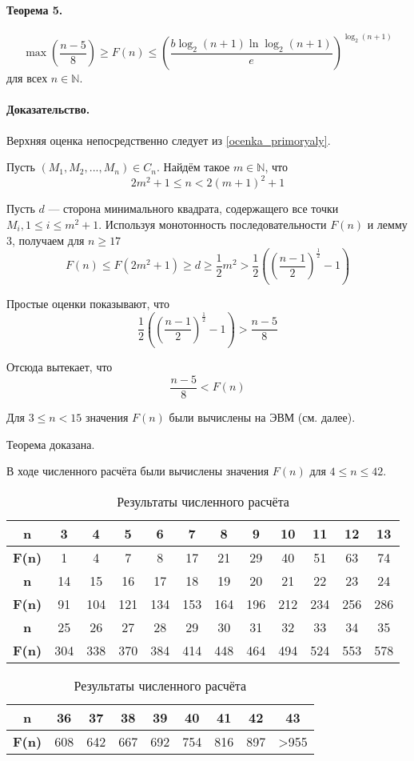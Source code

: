 \documentclass[a4paper,14pt]{article} %
\begin{document}
\paragraph{Теорема 5.}

$$
 \max\left( \frac{n-5}{8} \right) \geq F(n) \leq \left( \frac{b \log_2(n+1) \ln \log_2 (n+1)}{e}\right)^{\log_2(n+1)}
$$
для всех $n\in\mathbb{N}$.

\paragraph{Доказательство.}
Верхняя оценка непосредственно следует из \ref{ocenka_primoryaly}.

Пусть $\left(M_1, M_2, ..., M_n\right) \in C_n$.
Найдём такое $m\in \mathbb{N}$, что
$$
2m^2+1 \leq n < 2(m+1)^2 +1
$$

Пусть $d$ --- сторона минимального квадрата, содержащего все точки $M_i, 1\leq i \leq m^2+1$.
Используя монотонность последовательности $F(n)$ и лемму 3, получаем для $n\geq 17$
$$
F(n) \leq F\left(2m^2+1\right)\geq d \geq \frac{1}{2}m^2 > \frac{1}{2}\left(\left(\frac{n-1}{2}\right)^\frac{1}{2} - 1 \right)
$$

Простые оценки показывают, что
$$
\frac{1}{2}\left(\left(\frac{n-1}{2}\right)^\frac{1}{2} -1 \right) > \frac{n-5}{8}
$$

Отсюда вытекает, что
$$
\frac{n-5}{8}<F(n)
$$

Для $3 \leq n < 15$ значения $F(n)$ были вычислены на ЭВМ (см. далее).

Теорема доказана.

В ходе численного расчёта были вычислены значения $F(n)$ для $4\leq n \leq 42$.

\begin{table}[H]
\caption{Результаты численного расчёта}
\label{tabular:pc_counted}
\begin{center}
\begin{tabular}{|c|c|c|c|c|c|c|c|c|c|c|c|}
\hline
\textbf{n}    &  3 & 4 & 5 & 6 &  7 &  8 &  9 & 10 & 11 & 12 & 13 \\
\hline
\textbf{F(n)} &  1 & 4 & 7 & 8 & 17 & 21 & 29 & 40 & 51 & 63 & 74  \\
\hline
\hline
\textbf{n}    &  14 &  15 &  16 &  17 &  18 &  19 &  20 &  21 &  22 &  23 &  24 \\
\hline
\textbf{F(n)} &  91 & 104 & 121 & 134 & 153 & 164 & 196 & 212 & 234 & 256 & 286  \\
\hline
\hline
\textbf{n}    &  25 &  26 &  27 &  28 &  29 &  30 &  31 &  32 &  33 &  34 &  35 \\
\hline
\textbf{F(n)} & 304 & 338 & 370 & 384 & 414 & 448 & 464 & 494 & 524 & 553 & 578  \\
\hline
\end{tabular}
\begin{tabular}{|c|c|c|c|c|c|c|c|c|}
\hline
\textbf{n}    &  36 &  37 &  38 &  39 &  40 &  41 &  42 &  43  \\
\hline
\textbf{F(n)} & 608 & 642 & 667 & 692 & 754 & 816 & 897 & >955  \\
\hline
\end{tabular}
\end{center}
\end{table}
\end{document}
